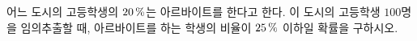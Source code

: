 어느 도시의 고등학생의 $20\mkern3mu \%$는 아르바이트를 한다고 한다. 이 도시의 고등학생 $100$명을 임의추출할 때, 아르바이트를 하는 학생의 비율이 $25\mkern3mu \%$ 이하일 확률을 구하시오. 
